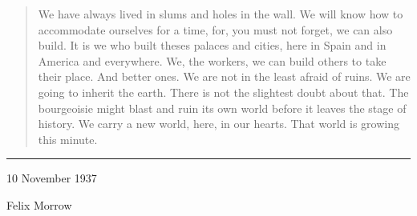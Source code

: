 \begin{quotation}
  We have always lived in slums and holes in the wall. We will know how to accommodate ourselves for a time, for\kn, you must not forget, we can also build. It is we who built theses palaces and cities, here in Spain and in America and everywhere. We, the workers, we can build others to take their place. And better ones. We are not in the least afraid of ruins. We are going to inherit the earth. There is not the slightest doubt about that. The bourgeoisie might blast and ruin its own world before it leaves the stage of history. We carry a new world, here, in our hearts. That world is growing this minute.\kn%
\end{quotation}

\begin{flushright}
  \bigskip
  
  \rule{0.5\textwidth}{0.8pt}
  
  \bigskip
  
  10 November 1937
  
  \smallskip
  
  \sffamily
  \itshape
  \large
  
  Felix Morrow
\end{flushright}